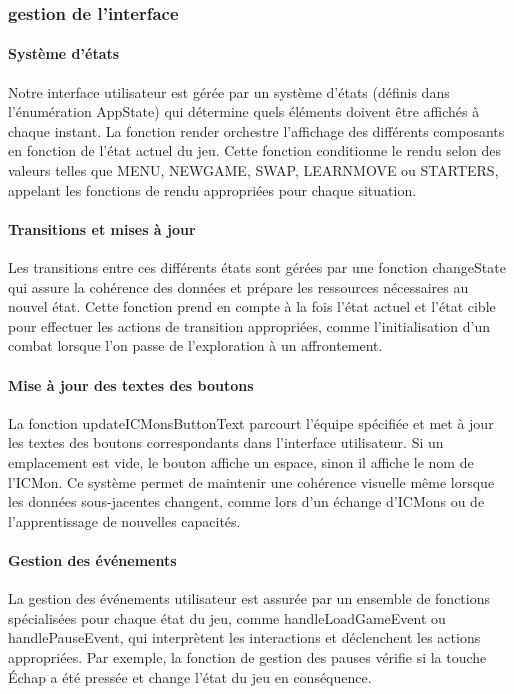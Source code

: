 \documentclass[12pt,a4paper, twoside]{article}
\begin{document}
\subsubsection{gestion de l'interface}
\paragraph{Système d'états} Notre interface utilisateur est gérée par un système d'états (définis dans l'énumération AppState) qui détermine quels éléments doivent être affichés à chaque instant. La fonction render orchestre l'affichage des différents composants en fonction de l'état actuel du jeu. Cette fonction conditionne le rendu selon des valeurs telles que MENU, NEWGAME, SWAP, LEARNMOVE ou STARTERS, appelant les fonctions de rendu appropriées pour chaque situation.

\paragraph{Transitions et mises à jour} Les transitions entre ces différents états sont gérées par une fonction changeState qui assure la cohérence des données et prépare les ressources nécessaires au nouvel état. Cette fonction prend en compte à la fois l'état actuel et l'état cible pour effectuer les actions de transition appropriées, comme l'initialisation d'un combat lorsque l'on passe de l'exploration à un affrontement.

\paragraph{Mise à jour des textes des boutons} La fonction updateICMonsButtonText parcourt l'équipe spécifiée et met à jour les textes des boutons correspondants dans l'interface utilisateur. Si un emplacement est vide, le bouton affiche un espace, sinon il affiche le nom de l'ICMon. Ce système permet de maintenir une cohérence visuelle même lorsque les données sous-jacentes changent, comme lors d'un échange d'ICMons ou de l'apprentissage de nouvelles capacités.

\paragraph{Gestion des événements} La gestion des événements utilisateur est assurée par un ensemble de fonctions spécialisées pour chaque état du jeu, comme handleLoadGameEvent ou handlePauseEvent, qui interprètent les interactions et déclenchent les actions appropriées. Par exemple, la fonction de gestion des pauses vérifie si la touche Échap a été pressée et change l'état du jeu en conséquence.
\end{document}
